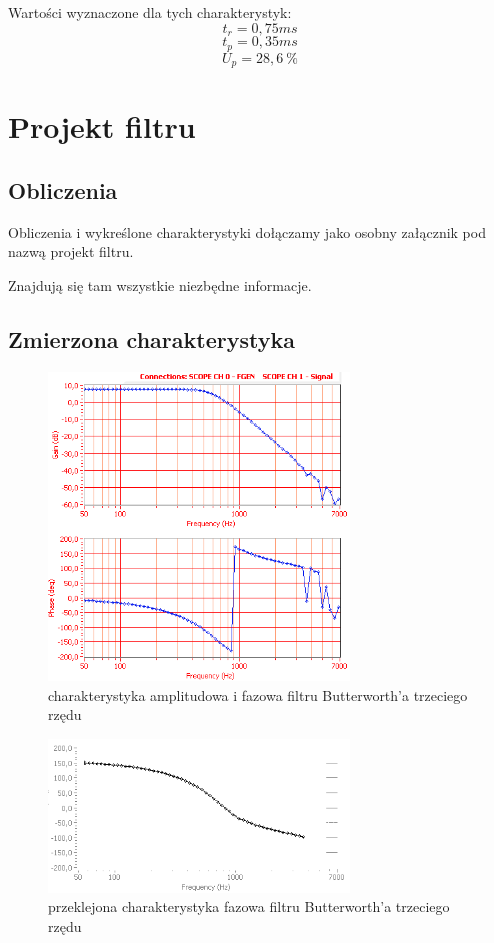\documentclass[a4paper,11pt]{article}
\begin{document}
Wartości wyznaczone dla tych charakterystyk: 
$$ t_r= 0,75 ms$$ 
$$ t_p= 0,35 ms$$ 
$$ U_p= 28,6 \  \% $$

\section{Projekt filtru}
\subsection{Obliczenia}
Obliczenia i wykreślone charakterystyki dołączamy jako osobny załącznik pod nazwą projekt filtru.

Znajdują się tam wszystkie niezbędne informacje.
\subsection{Zmierzona charakterystyka}

\begin{figure}[H]
\begin{center}
\includegraphics[width=8cm]{obrazki/maslowilkcialobialy.png}
\end{center}
\caption{charakterystyka amplitudowa i fazowa filtru Butterworth'a trzeciego rzędu}
\end{figure}

\begin{figure}[H]
\begin{center}
\includegraphics[width=8cm]{obrazki/maslowilkcialoliniabialyiulepszony.png}
\end{center}
\caption{przeklejona charakterystyka fazowa filtru Butterworth'a trzeciego rzędu}
\end{figure}
\end{document}
